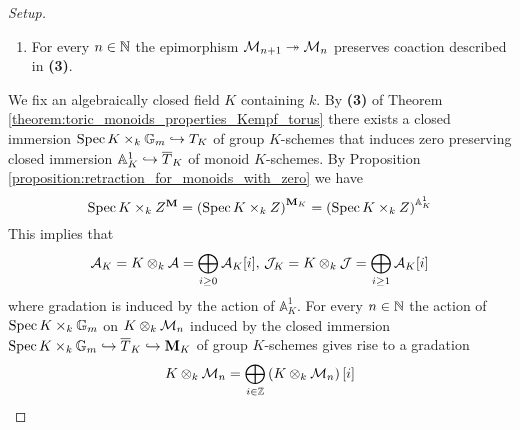 \begin{proof}[Setup]
\begin{enumerate}[label=\textbf{(\arabic*)}, leftmargin=3.0em]
\item For every $n\in {\mathbb N}$ the epimorphism ${\mathcal M}_{n+1} \twoheadrightarrow {\mathcal M}_n$ preserves coaction described in \textbf{(3)}.
\end{enumerate}
We fix an algebraically closed field $K$ containing $k$. By \textbf{(3)} of Theorem \ref{theorem:toric_monoids_properties_Kempf_torus} there exists a closed immersion $\mathrm{Spec}\, K\times_k \mathbb{G}_m\hookrightarrow T_K$ of group $K$-schemes that induces zero preserving closed immersion $\mathbb{A}^1_K\hookrightarrow \overline{T}_K$ of monoid $K$-schemes. By Proposition \ref{proposition:retraction_for_monoids_with_zero} we have
$$\mathrm{Spec}\, K\times_k Z^{\mathbf{M}} = \left(\mathrm{Spec}\, K\times_k Z\right)^{\mathbf{M}_K} = \left(\mathrm{Spec}\, K\times_k Z\right)^{\mathbb{A}^1_K}$$
This implies that
$${\mathcal A}_K = K\otimes_k{\mathcal A} = \bigoplus_{i\geq 0}{\mathcal A}_K[i],\,{\mathcal J}_K = K\otimes_k{\mathcal J} = \bigoplus_{i\geq 1}{\mathcal A}_K[i]$$
where gradation is induced by the action of $\mathbb{A}^1_K$. For every $n\in {\mathbb N}$ the action of $\mathrm{Spec}\, K\times_k \mathbb{G}_m$ on $K\otimes_k{\mathcal M}_n$ induced by the closed immersion $\mathrm{Spec}\, K\times_k \mathbb{G}_m \hookrightarrow \overline{T}_K\hookrightarrow \mathbf{M}_K$ of group $K$-schemes gives rise to a gradation
$$K\otimes_k{\mathcal M}_n = \bigoplus_{i\in {\mathbb Z}}\left(K\otimes_k{\mathcal M}_n\right)[i]$$
\end{proof}

